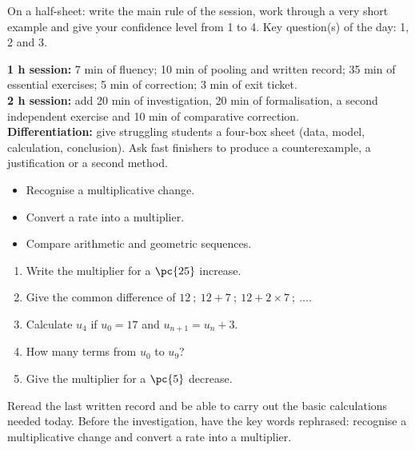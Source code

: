 \begin{exitticket}[3 minutes]On a half-sheet: write the main rule of the session, work through a very short example and give your confidence level from 1 to 4. Key question(s) of the day: 1, 2 and 3.\end{exitticket}

\ifmxteacher
\begin{method}
\textbf{1 h session:} 7 min of fluency; 10 min of pooling and written record; 35 min of essential exercises; 5 min of correction; 3 min of exit ticket.\\
    \textbf{2 h session:} add 20 min of investigation, 20 min of formalisation, a second independent exercise and 10 min of comparative correction.\\
    \textbf{Differentiation:} give struggling students a four-box sheet (data, model, calculation, conclusion). Ask fast finishers to produce a counterexample, a justification or a second method.
\end{method}
\fi
{}
    \begin{objectives}\begin{itemize}\item Recognise a multiplicative change.\item Convert a rate into a multiplier.\item Compare arithmetic and geometric sequences.\end{itemize}\end{objectives}
    \begin{fluency}\begin{enumerate}\item Write the multiplier for a $\pc{25}$ increase. \item Give the common difference of $12\ ;\ 12+7\ ;\ 12+2\times7\ ;\ \ldots$. \item Calculate $u_4$ if $u_0=17$ and $u_{n+1}=u_n+3$. \item How many terms from $u_{0}$ to $u_{9}$? \item Give the multiplier for a $\pc{5}$ decrease. \end{enumerate}\end{fluency}
    \begin{prerequisites}Reread the last written record and be able to carry out the basic calculations needed today. Before the investigation, have the key words rephrased: recognise a multiplicative change and convert a rate into a multiplier.\end{prerequisites}

